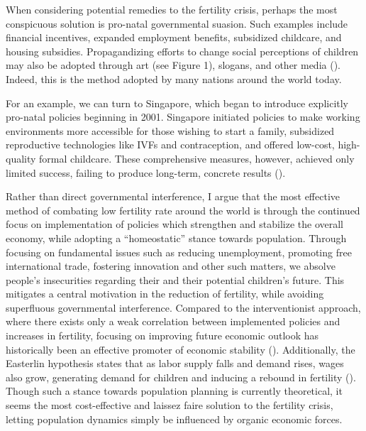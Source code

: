 When considering potential remedies to the fertility crisis, perhaps the most conspicuous solution is pro-natal governmental suasion. Such examples include financial incentives, expanded employment benefits, subsidized childcare, and housing subsidies. Propagandizing efforts to change social perceptions of children may also be adopted through art (see Figure 1), slogans, and other media (\cite[p.\ 37]{kohler2006low}). Indeed, this is the method adopted by many nations around the world today.

For an example, we can turn to Singapore, which began to introduce explicitly pro-natal policies beginning in 2001. Singapore initiated policies to make working environments more accessible for those wishing to start a family, subsidized reproductive technologies like IVFs and contraception, and offered low-cost, high-quality formal childcare. These comprehensive measures, however, achieved only limited success, failing to produce long-term, concrete results (\cite{tan2020lessons}).

Rather than direct governmental interference, I argue that the most effective method of combating low fertility rate around the world is through the continued focus on implementation of policies which strengthen and stabilize the overall economy, while adopting a “homeostatic” stance towards population. Through focusing on fundamental issues such as reducing unemployment, promoting free international trade, fostering innovation and other such matters, we absolve people’s insecurities regarding their and their potential children’s future. This mitigates a central motivation in the reduction of fertility, while avoiding superfluous governmental interference. Compared to the interventionist approach, where there exists only a weak correlation between implemented policies and increases in fertility, focusing on improving future economic outlook has historically been an effective promoter of economic stability (\cites[pp.\ 93–97]{kearney2023causes}{stern2022ways}). Additionally, the Easterlin hypothesis states that as labor supply falls and demand rises, wages also grow, generating demand for children and inducing a rebound in fertility (\cites{easterlin1987birth}[p.\ 31]{kohler2006low}). Though such a stance towards population planning is currently theoretical, it seems the most cost-effective and laissez faire solution to the fertility crisis, letting population dynamics simply be influenced by organic economic forces. 

\newpage

